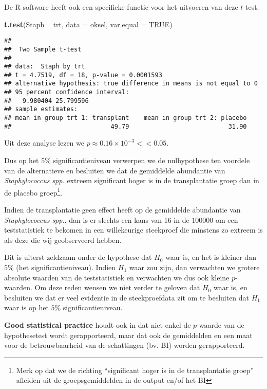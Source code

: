 \documentclass[12pt,dutch,coursenotes]{book}
\newenvironment{Shaded}{\begin{snugshade}}{\end{snugshade}}
\newcommand{\KeywordTok}[1]{\textcolor[rgb]{0.13,0.29,0.53}{\textbf{#1}}}
\newcommand{\DataTypeTok}[1]{\textcolor[rgb]{0.13,0.29,0.53}{#1}}
\newcommand{\StringTok}[1]{\textcolor[rgb]{0.31,0.60,0.02}{#1}}
\newcommand{\OtherTok}[1]{\textcolor[rgb]{0.56,0.35,0.01}{#1}}
\newcommand{\OperatorTok}[1]{\textcolor[rgb]{0.81,0.36,0.00}{\textbf{#1}}}
\newcommand{\NormalTok}[1]{#1}
\let\rmarkdownfootnote\footnote%
\def\footnote{\protect\rmarkdownfootnote}
\theoremstyle{definition}
\theoremstyle{definition}
\theoremstyle{definition}
\theoremstyle{remark}
\begin{document}
De R software heeft ook een specifieke functie voor het uitvoeren van
deze \(t\)-test.

\begin{Shaded}
\begin{Highlighting}[]
\KeywordTok{t.test}\NormalTok{(Staph }\OperatorTok{~}\StringTok{ }\NormalTok{trt, }\DataTypeTok{data =}\NormalTok{ oksel, }\DataTypeTok{var.equal =} \OtherTok{TRUE}\NormalTok{)}
\end{Highlighting}
\end{Shaded}

\begin{verbatim}
## 
##  Two Sample t-test
## 
## data:  Staph by trt
## t = 4.7519, df = 18, p-value = 0.0001593
## alternative hypothesis: true difference in means is not equal to 0
## 95 percent confidence interval:
##   9.980404 25.799596
## sample estimates:
## mean in group trt 1: transplant    mean in group trt 2: placebo 
##                           49.79                           31.90
\end{verbatim}

Uit deze analyse lezen we \(p\approx 0.16 \times 10^{-3}<<0.05\).

Dus op het \(5\%\) significantieniveau verwerpen we de nulhypothese ten
voordele van de alternatieve en besluiten we dat de gemiddelde
abundantie van \emph{Staphylococcus spp.} extreem significant hoger is
in de transplantatie groep dan in de placebo groep\footnote{Merk op dat
  we de richting ``significant hoger is in de transplantatie groep''
  afleiden uit de groepsgemiddelden in de output en/of het BI}.

Indien de transplantatie geen effect heeft op de gemiddelde abundantie
van \emph{Staphylococcus spp.}, dan is er slechts een kans van 16 in de
\(100000\) om een teststatistiek te bekomen in een willekeurige
steekproef die minstens zo extreem is als deze die wij geobserveerd
hebben.

Dit is uiterst zeldzaam onder de hypothese dat \(H_0\) waar is, en het
is kleiner dan \(5\%\) (het significantieniveau). Indien \(H_1\) waar
zou zijn, dan verwachten we grotere absolute waarden van de
teststatistiek en verwachten we dus ook kleine \(p\)-waarden. Om deze
reden wensen we niet verder te geloven dat \(H_0\) waar is, en besluiten
we dat er veel evidentie in de steekproefdata zit om te besluiten dat
\(H_1\) waar is op het \(5\%\) significantieniveau.

\textbf{Good statistical practice} houdt ook in dat niet enkel de
\(p\)-waarde van de hypothesetest wordt gerapporteerd, maar dat ook de
gemiddelden en een maat voor de betrouwbaarheid van de schattingen (bv.
BI) worden gerapporteerd.
\end{document}
